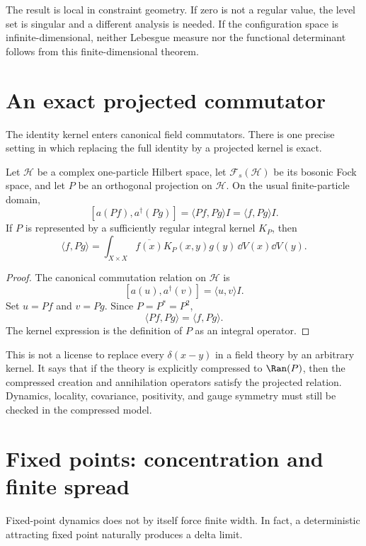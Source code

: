 \documentclass[11pt]{article}
\newcommand{\Hh}{\mathcal H}
\newcommand{\Fock}{\mathcal F}
\begin{document}
The result is local in constraint geometry. If zero is not a regular value,
the level set is singular and a different analysis is needed. If the
configuration space is infinite-dimensional, neither Lebesgue measure nor the
functional determinant follows from this finite-dimensional theorem.

\section{An exact projected commutator}

The identity kernel enters canonical field commutators. There is one precise
setting in which replacing the full identity by a projected kernel is exact.

\begin{theorem}
\label{thm:compressed-ccr}
Let \(\Hh\) be a complex one-particle Hilbert space, let
\(\Fock_s(\Hh)\) be its bosonic Fock space, and let \(P\) be an orthogonal
projection on \(\Hh\). On the usual finite-particle domain,
\[
[a(Pf),a^\dagger(Pg)]
=\langle Pf,Pg\rangle I
=\langle f,Pg\rangle I.
\]
If \(P\) is represented by a sufficiently regular integral kernel \(K_P\),
then
\[
\langle f,Pg\rangle
=
\int_{X\times X}
\overline{f(x)}K_P(x,y)g(y)
\,\dd V(x)\dd V(y).
\]
\end{theorem}

\begin{proof}
The canonical commutation relation on \(\Hh\) is
\[
[a(u),a^\dagger(v)]=\langle u,v\rangle I.
\]
Set \(u=Pf\) and \(v=Pg\). Since \(P=P^\ast=P^2\),
\[
\langle Pf,Pg\rangle=\langle f,Pg\rangle.
\]
The kernel expression is the definition of \(P\) as an integral operator.
\end{proof}

This is not a license to replace every
\(\delta(x-y)\) in a field theory by an arbitrary kernel. It says that if the
theory is explicitly compressed to \(\Ran(P)\), then the compressed creation
and annihilation operators satisfy the projected relation. Dynamics,
locality, covariance, positivity, and gauge symmetry must still be checked in
the compressed model.

\section{Fixed points: concentration and finite spread}

Fixed-point dynamics does not by itself force finite width. In fact, a
deterministic attracting fixed point naturally produces a delta limit.
\end{document}
